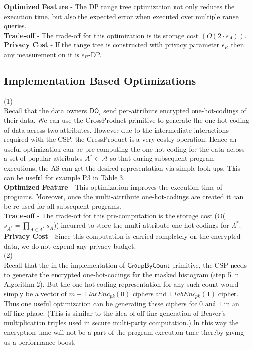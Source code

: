 \textbf{Optimized Feature} - The DP range tree optimization not only reduces the execution time, but also the expected error when executed over multiple range queries.\\\textbf{Trade-off} - The trade-off for this optimization is its storage cost $(O(2\cdot s_A))$.\\\textbf{Privacy Cost} - If the range tree is constructed  with privacy parameter $\epsilon_R$ then any measurement on it is $\epsilon_R$-DP.
\subsection*{Implementation Based Optimizations}
(1)  \\
Recall that the data owners $\textsf{DO}_i$ send per-attribute encrypted one-hot-codings of their data. We can use the \textsf{CrossProduct} primitive to generate the one-hot-coding of data across two attributes. However due to the intermediate interactions required with the \textsf{CSP}, the \textsf{CrossProduct} is a very costly operation. Hence an  useful optimization can be pre-computing the one-hot-coding for the data across a set of popular attributes $A^* \subset \mathcal{A}$ so that during subsequent program executions, the \textsf{AS} can get the desired representation via simple look-ups.  This can be useful for example P3 in Table 3.\\
\textbf{Optimized Feature} - This optimization improves the execution time of \system programs. Moreover, once the multi-attribute one-hot-codings are created it can be re-used for all subsequent programs.\\
\textbf{Trade-off} - The trade-off for this pre-computation is the storage cost (O($s_{A^*}=\prod_{A \in A^*}s_A$)) incurred to store the multi-attribute one-hot-codings for $A^*$.\\
\textbf{Privacy Cost} - Since this computation is carried completely on the encrypted data, we do not expend any privacy budget.\\
(2)\\
Recall that the in the implementation of $\textsf{GroupByCount}$ primitive, the \textsf{CSP} needs to generate the encrypted one-hot-codings for the masked histogram (step 5 in Algorithm 2). But the one-hot-coding representation for any such count would simply be a vector of $m-1$ $labEnc_{pk}(0)$ ciphers and 1 $labEnc_{pk}(1)$ cipher. Thus one useful optimization can be generating these ciphers for $0$ and $1$ in an off-line phase. (This is similar to the idea of off-line generation of Beaver's multiplication triples \cite{Beaver} used in secure multi-party computation.) In this way the encryption time will not be a part of the program execution time thereby giving us a performance boost.\\
